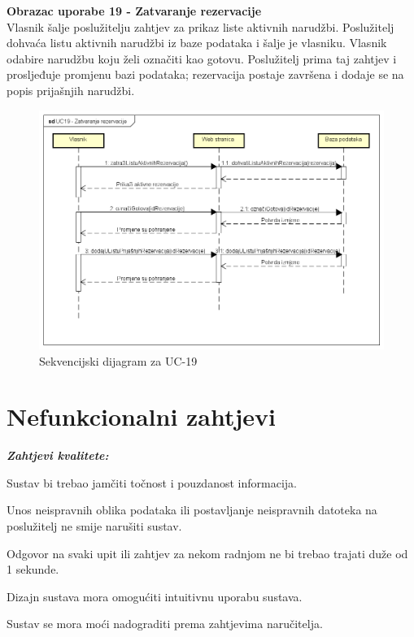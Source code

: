                 \newpage\noindent\textbf{Obrazac uporabe 19 -  Zatvaranje rezervacije}\\
                
				\noindent Vlasnik šalje poslužitelju zahtjev za prikaz liste aktivnih narudžbi. Poslužitelj dohvaća listu aktivnih narudžbi iz baze podataka i šalje je vlasniku. Vlasnik odabire narudžbu koju želi označiti kao gotovu. Poslužitelj prima taj zahtjev i prosljeđuje promjenu bazi podataka; rezervacija postaje završena i dodaje se na popis prijašnjih narudžbi.
				
				\begin{figure}[hp]
                    \centering
                    \includegraphics[width=16cm]{slike/UC19_Zatvaranje_rezervacije.png}
                    \caption{Sekvencijski dijagram za UC-19}
                    \label{fig:SD_UC19}
                \end{figure}
				
		\pagebreak
	
		\section{Nefunkcionalni zahtjevi}
		
		    	\textbf{\textit{Zahtjevi kvalitete:}}\\
		 
		\begin{packed_item}
	
						\item Sustav bi trebao jamčiti točnost i pouzdanost informacija.
						\item  Unos neispravnih oblika podataka ili postavljanje neispravnih datoteka na poslužitelj ne smije narušiti sustav.
						\item Odgovor na svaki upit ili zahtjev za nekom radnjom ne bi trebao trajati duže od 1 sekunde.
						\item  Dizajn sustava mora omogućiti intuitivnu uporabu sustava.
						\item Sustav se mora moći nadograditi prema zahtjevima naručitelja.
						
					\end{packed_item}
				
